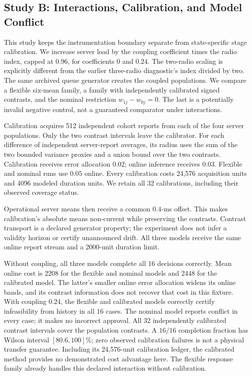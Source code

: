 \subsection{Study B: Interactions, Calibration, and Model Conflict}

This study keeps the instrumentation boundary separate from state-specific
stage calibration. We increase server load by the coupling coefficient times
the radio index, capped at $0.96$, for coefficients $0$ and $0.24$. The
two-radio scaling is explicitly different from the earlier three-radio
diagnostic's index divided by two. The same archived queue generator creates
the coupled populations. We compare a flexible six-mean family, a family
with independently calibrated signed contrasts, and the nominal restriction
$w_{1j}-w_{0j}=0$. The last is a potentially invalid negative control, not a
guaranteed comparator under interactions.

Calibration acquires 512 independent cohort reports from each of the four
server populations. Only the two contrast intervals leave the calibrator.
For each difference of independent server-report averages, its radius uses
the sum of the two bounded variance proxies and a union bound over the two
contrasts. Calibration receives error allocation $0.02$; online inference
receives $0.03$. Flexible and nominal runs use $0.05$ online. Every calibration
costs 24,576 acquisition units and 4096 modeled duration units. We retain all
32 calibrations, including their observed coverage status.

Operational server means then receive a common $0.4$-ms offset. This makes
calibration's absolute means non-current while preserving the contrasts.
Contrast transport is a declared generator property; the experiment does
not infer a validity horizon or certify unannounced drift. All three models
receive the same online report stream and a 2000-unit duration limit.

Without coupling, all three models complete all 16 decisions correctly.
Mean online cost is 2208 for the flexible and nominal models and 2448 for
the calibrated model. The latter's smaller online error allocation widens
its online bands, and its contrast information does not recover that cost
in this fixture. With coupling $0.24$, the flexible and calibrated models
correctly certify infeasibility from history in all 16 cases. The nominal
model reports conflict in every case; it makes no incorrect approval.
All 32 independently calibrated contrast intervals cover the population
contrasts. A $16/16$ completion fraction has Wilson interval
$[80.6,100]\%$; zero observed calibration failures is not a physical transfer
guarantee. Including its 24,576-unit calibration ledger, the calibrated
method provides no demonstrated cost advantage here. The flexible response
family already handles this declared interaction without calibration.


